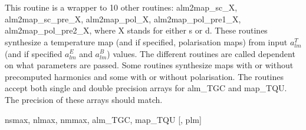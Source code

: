 
\sloppy


\section[alm2map*]{ }
\label{sub:alm2map}
\author{Eric Hivon, Frode K.~Hansen}

\begin{facility}
{This routine is a wrapper to 10 other routines: alm2map\_sc\_X,
  alm2map\_sc\_pre\_X, alm2map\_pol\_X, alm2map\_pol\_pre1\_X,
  alm2map\_pol\_pre2\_X, where X stands for either s or d. These routines
  synthesize a  temperature map (and if specified, polarisation maps) 
from input $a_{lm}^T$ (and if specified $a_{lm}^E$ and $a_{lm}^B$) values. 
The different routines are called dependent on what parameters are passed. 
Some routines synthesize maps with or without precomputed harmonics and some
  with or without polarisation. 
The routines accept both single and double precision arrays for alm\_TGC and
  map\_TQU. The precision of these arrays should match.}
{\modAlmTools}
\end{facility}

\begin{f90format}
{nsmax, nlmax, nmmax, alm\_TGC, map\_TQU [, plm]}
\end{f90format}

